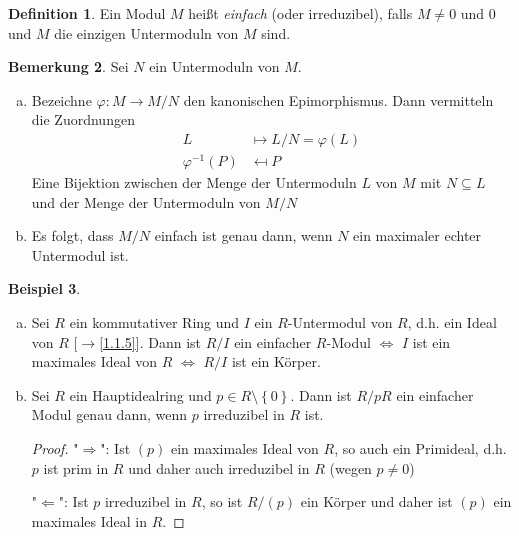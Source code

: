 \documentclass[
twoside=semi,
fontsize=12,
DIV=12, 
cleardoublepage=current,
leqno,
headings=optiontoheadandtoc, 
toc=idx
]{scrbook}
\newcommand{\set}[1]{\left\{ #1 \right\}}
\theoremstyle{definition}
\newtheorem{definition}{Definition}[section]
\newtheorem{bemerkung}[definition]{Bemerkung}
\newtheorem{beispiel}[definition]{Beispiel}
\begin{document}
	\begin{definition}\label{1.3.2}\hfill\newline
		Ein Modul $M$ hei\ss t \emph{einfach} (oder irreduzibel), falls $M \neq 0$ und $0$ und $M$ die einzigen Untermoduln von $M$ sind.
	\end{definition}
	
	\begin{bemerkung}\label{1.3.3}\hfill\newline
		Sei $N$ ein Untermoduln von $M$.
		\begin{enumerate}[(a)]
			\item Bezeichne $\varphi: M \to M/N$ den kanonischen Epimorphismus. Dann vermitteln die Zuordnungen
			\begin{align*}
				L &\mapsto L/N = \varphi(L) \\
				\varphi^{-1}(P) &\mapsfrom P
			\end{align*}
			Eine Bijektion zwischen der Menge der Untermoduln $L$ von $M$ mit $N \subseteq L$ und der Menge der Untermoduln von $M/N$
					
			\item Es folgt, dass $M/N$ einfach ist genau dann, wenn $N$ ein maximaler echter Untermodul ist.
		\end{enumerate}
	\end{bemerkung}

	\begin{beispiel}\label{1.3.4}\hfill
		\begin{enumerate}[(a)]
			\item Sei $R$ ein kommutativer Ring und $I$ ein $R$-Untermodul von $R$, d.h. ein Ideal von $R$ [$\to$\ref{1.1.5}]. Dann ist $R/I$ ein einfacher $R$-Modul $\Leftrightarrow$ $I$ ist ein maximales Ideal von $R$ $\Leftrightarrow$ $R/I$ ist ein K\"orper.
			
			\item Sei $R$ ein Hauptidealring und $p \in R\setminus \set{0}$. Dann ist $R/pR$ ein einfacher Modul genau dann, wenn $p$ irreduzibel in $R$ ist.
			
			\begin{proof}\hfill\newline
				"$\Longrightarrow$": Ist $(p)$ ein maximales Ideal von $R$, so auch ein Primideal, d.h. $p$ ist prim in $R$ und daher auch irreduzibel in $R$ (wegen $p \neq 0$) 
				
				"$\Longleftarrow$": Ist $p$ irreduzibel in $R$, so ist $R/(p)$ ein K\"orper und daher ist $(p)$ ein maximales Ideal in $R$.
			\end{proof}
		\end{enumerate}
	\end{beispiel}
\end{document}
